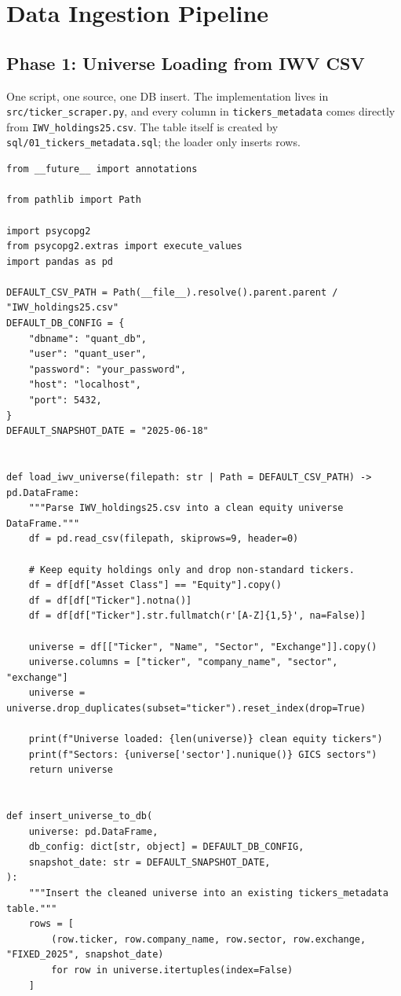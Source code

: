 \documentclass[11pt, oneside]{book}
\begin{document}
\chapter{Data Ingestion Pipeline}

\section{Phase 1: Universe Loading from IWV CSV}

One script, one source, one DB insert. The implementation lives in \texttt{src/ticker\_scraper.py}, and every column in \texttt{tickers\_metadata} comes directly from \texttt{IWV\_holdings25.csv}. The table itself is created by \texttt{sql/01\_tickers\_metadata.sql}; the loader only inserts rows.

\begin{lstlisting}[style=pythonstyle, caption={Loading IWV CSV Directly into PostgreSQL}]
from __future__ import annotations

from pathlib import Path

import psycopg2
from psycopg2.extras import execute_values
import pandas as pd

DEFAULT_CSV_PATH = Path(__file__).resolve().parent.parent / "IWV_holdings25.csv"
DEFAULT_DB_CONFIG = {
    "dbname": "quant_db",
    "user": "quant_user",
    "password": "your_password",
    "host": "localhost",
    "port": 5432,
}
DEFAULT_SNAPSHOT_DATE = "2025-06-18"


def load_iwv_universe(filepath: str | Path = DEFAULT_CSV_PATH) -> pd.DataFrame:
    """Parse IWV_holdings25.csv into a clean equity universe DataFrame."""
    df = pd.read_csv(filepath, skiprows=9, header=0)

    # Keep equity holdings only and drop non-standard tickers.
    df = df[df["Asset Class"] == "Equity"].copy()
    df = df[df["Ticker"].notna()]
    df = df[df["Ticker"].str.fullmatch(r'[A-Z]{1,5}', na=False)]

    universe = df[["Ticker", "Name", "Sector", "Exchange"]].copy()
    universe.columns = ["ticker", "company_name", "sector", "exchange"]
    universe = universe.drop_duplicates(subset="ticker").reset_index(drop=True)

    print(f"Universe loaded: {len(universe)} clean equity tickers")
    print(f"Sectors: {universe['sector'].nunique()} GICS sectors")
    return universe


def insert_universe_to_db(
    universe: pd.DataFrame,
    db_config: dict[str, object] = DEFAULT_DB_CONFIG,
    snapshot_date: str = DEFAULT_SNAPSHOT_DATE,
):
    """Insert the cleaned universe into an existing tickers_metadata table."""
    rows = [
        (row.ticker, row.company_name, row.sector, row.exchange, "FIXED_2025", snapshot_date)
        for row in universe.itertuples(index=False)
    ]


\end{lstlisting}
\end{document}
